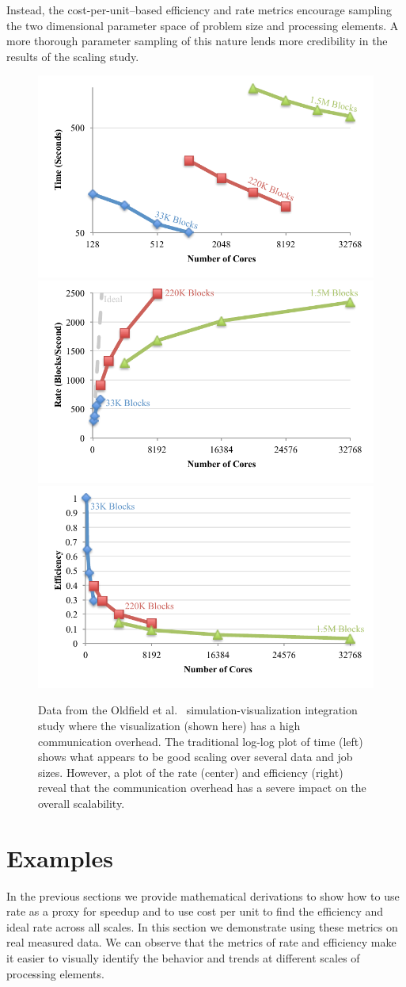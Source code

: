 \documentclass[conference]{IEEEtran}
\newcommand*{\scite}[1]{~\cite{#1}}
\newcommand{\etal}{et al.\xspace}
\begin{document}
Instead, the cost-per-unit--based efficiency and rate metrics encourage
sampling the two dimensional parameter space of problem size and processing
elements. A more thorough parameter sampling of this nature lends more
credibility in the results of the scaling study.


\begin{figure}
  \includegraphics[width=.33\linewidth]{images/OldfieldTimeLog}%
  \includegraphics[width=.33\linewidth]{images/OldfieldRate}%
  \includegraphics[width=.33\linewidth]{images/OldfieldEfficiency}
  \caption{Data from the Oldfield \etal\scite{Oldfield2014,Rogers2013}
    simulation-visualization integration study where the visualization
    (shown here) has a high communication overhead. The traditional log-log
    plot of time (left) shows what appears to be good scaling over several
    data and job sizes. However, a plot of the rate (center) and efficiency
    (right) reveal that the communication overhead has a severe impact on
    the overall scalability.}
  \label{fig:Oldfield}
\end{figure}


\section{Examples}

\noindent
In the previous sections we provide mathematical derivations to show how
to use rate as a proxy for speedup and to use cost per unit to find the
efficiency and ideal rate across all scales. In this section we demonstrate
using these metrics on real measured data. We can observe that the metrics
of rate and efficiency make it easier to visually identify the behavior and
trends at different scales of processing elements.
\end{document}
